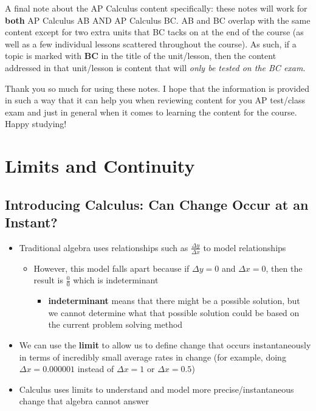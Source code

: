 \documentclass{package/notes}
\begin{document}
A final note about the AP Calculus content specifically: these notes will work for \textbf{both} AP Calculus AB AND AP Calculus BC. AB and BC overlap with the same content except for two extra units that BC tacks on at the end of the course (as well as a few individual lessons scattered throughout the course). As such, if a topic is marked with \textbf{BC} in the title of the unit/lesson, then the content addressed in that unit/lesson is content that will \textit{only be tested on the BC exam}.\newline

Thank you so much for using these notes. I hope that the information is provided in such a way that it can help you when reviewing content for you AP test/class exam and just in general when it comes to learning the content for the course. Happy studying!




\chapter{Limits and Continuity}

\section{Introducing Calculus: Can Change Occur at an Instant?}
\begin{itemize}
	\item Traditional algebra uses relationships such as $\frac{\Delta y}{\Delta x}$ to model relationships
	\begin{itemize}
		\item However, this model falls apart because if $\Delta y = 0$ and $\Delta x = 0$, then the result is $\frac{0}{0}$ which is indeterminant
		\begin{itemize}
			\item \textbf{indeterminant} means that there might be a possible solution, but we cannot determine what that possible solution could be based on the current problem solving method
		\end{itemize}
	\end{itemize}

	\item We can use the \textbf{limit} to allow us to define change that occurs instantaneously in terms of incredibly small average rates in change (for example, doing $\Delta x = 0.000001$ instead of $\Delta x = 1$ or $\Delta x = 0.5$)
	\item Calculus uses limits to understand and model more precise/instantaneous change that algebra cannot answer
\end{itemize}
\end{document}
